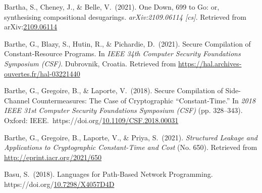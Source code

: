 \documentclass[12pt,twoside]{article}
\begin{document}
{\begin{thebibliography}{1079}
\mdbibitemlabel{}Bartha, S., Cheney, J., \& Belle, V.~(2021). One Down, 699 to Go: or, synthesising compositional desugarings. \emph{arXiv:2109.06114 {}[cs]}. Retrieved from arXiv:\href{http://arxiv.org/abs/2109.06114}{2109.06114}%

\mdbibitemlabel{}Barthe, G., Blazy, S., Hutin, R., \& Pichardie, D.~(2021). Secure Compilation of Constant-Resource Programs. In \emph{IEEE 34th Computer Security Foundations Symposium (CSF)}. Dubrovnik, Croatia. Retrieved from \href{https://hal.archives-ouvertes.fr/hal-03221440}{{\ttfamily https://\hspace{0pt}hal.\hspace{0pt}archives-\hspace{0pt}ouvertes.\hspace{0pt}fr/\hspace{0pt}hal-\hspace{0pt}03221440}}%

\mdbibitemlabel{}Barthe, G., Gregoire, B., \& Laporte, V.~(2018). Secure Compilation of Side-Channel Countermeasures: The Case of Cryptographic \textquotedblleft{}Constant-Time.\textquotedblright{} In \emph{2018 IEEE 31st Computer Security Foundations Symposium (CSF)} (pp. 328–343). Oxford: IEEE.~https://doi.org/\href{https://dx.doi.org/10.1109/CSF.2018.00031}{10.1109/CSF.2018.00031}%

\mdbibitemlabel{}Barthe, G., Gregoire, B., Laporte, V., \& Priya, S.~(2021). \emph{Structured Leakage and Applications to Cryptographic Constant-Time and Cost} (No. 650). Retrieved from \href{http://eprint.iacr.org/2021/650}{{\ttfamily http://\hspace{0pt}eprint.\hspace{0pt}iacr.\hspace{0pt}org/\hspace{0pt}2021/\hspace{0pt}650}}%

\mdbibitemlabel{}Basu, S.~(2018). Languages for Path-Based Network Programming. https://doi.org/\href{https://dx.doi.org/10.7298/X4057D4D}{10.7298/X4057D4D}%


\end{thebibliography}}
\end{document}

